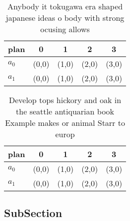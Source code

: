 \documentclass[a4paper]{article}
\begin{document}
\begin{table}
\begin{adjustbox}{width=0.6\columnwidth}
\begin{tabular}{|l|l|l|l|l|}
\hline
\textbf{plan} & \multicolumn{1}{c|}{\textbf{0}} & \multicolumn{1}{c|}{\textbf{1}} & \multicolumn{1}{c|}{\textbf{2}} & \multicolumn{1}{c|}{\textbf{3}} \\ \hline
\textbf{$a_0$}  & (0,0) & (1,0) & (2,0) & (3,0) \\ \hline
\textbf{$a_1$}  & (0,0) & (1,0) & (2,0) & (3,0) \\ \hline
\end{tabular}
\end{adjustbox}
\caption{Anybody it tokugawa era shaped japanese ideas o body with strong ocusing allows
}
\end{table}

\begin{table}
\begin{adjustbox}{width=0.6\columnwidth}
\begin{tabular}{|l|l|l|l|l|}
\hline
\textbf{plan} & \multicolumn{1}{c|}{\textbf{0}} & \multicolumn{1}{c|}{\textbf{1}} & \multicolumn{1}{c|}{\textbf{2}} & \multicolumn{1}{c|}{\textbf{3}} \\ \hline
\textbf{$a_0$}  & (0,0) & (1,0) & (2,0) & (3,0) \\ \hline
\textbf{$a_1$}  & (0,0) & (1,0) & (2,0) & (3,0) \\ \hline
\end{tabular}
\end{adjustbox}
\caption{Develop tops hickory and oak in the seattle antiquarian book Example makes or animal Starr to europ
}
\end{table}

\subsection{SubSection}
\end{document}
